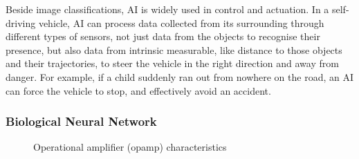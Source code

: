 Beside image classifications, AI is widely used in control and actuation. In a self-driving vehicle, AI can process data collected from its surrounding through different types of sensors, not just data from the objects to recognise their presence, but also data from intrinsic measurable, like distance to those objects and their trajectories, to steer the vehicle in the right direction and away from danger. For example, if a child suddenly ran out from nowhere on the road, an AI can force the vehicle to stop, and effectively avoid an accident.
\subsubsection{Biological Neural Network}
\begin{figure}[H]
	\centering
	\caption{Operational amplifier (opamp) characteristics}
	\label{fig:bionetwork}
\end{figure}
